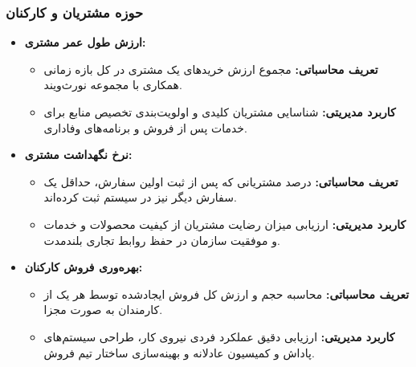 \documentclass[14pt,a4paper]{extarticle}
\begin{document}
	\subsubsection{حوزه مشتریان و کارکنان}
	\begin{itemize}
		\item \textbf{ارزش طول عمر مشتری:}
		\begin{itemize}
			\item \textbf{تعریف محاسباتی:} مجموع ارزش خریدهای یک مشتری در کل بازه زمانی همکاری با مجموعه نورث‌ویند.
			\item \textbf{کاربرد مدیریتی:} شناسایی مشتریان کلیدی و اولویت‌بندی تخصیص منابع برای خدمات پس از فروش و برنامه‌های وفاداری.
		\end{itemize}
		
		\item \textbf{نرخ نگهداشت مشتری:}
		\begin{itemize}
			\item \textbf{تعریف محاسباتی:} درصد مشتریانی که پس از ثبت اولین سفارش، حداقل یک سفارش دیگر نیز در سیستم ثبت کرده‌اند.
			\item \textbf{کاربرد مدیریتی:} ارزیابی میزان رضایت مشتریان از کیفیت محصولات و خدمات و موفقیت سازمان در حفظ روابط تجاری بلندمدت.
		\end{itemize}
		
		\item \textbf{بهره‌وری فروش کارکنان:}
		\begin{itemize}
			\item \textbf{تعریف محاسباتی:} محاسبه حجم و ارزش کل فروش ایجادشده توسط هر یک از کارمندان به صورت مجزا.
			\item \textbf{کاربرد مدیریتی:} ارزیابی دقیق عملکرد فردی نیروی کار، طراحی سیستم‌های پاداش و کمیسیون عادلانه و بهینه‌سازی ساختار تیم فروش.
		\end{itemize}
	\end{itemize}
\end{document}
